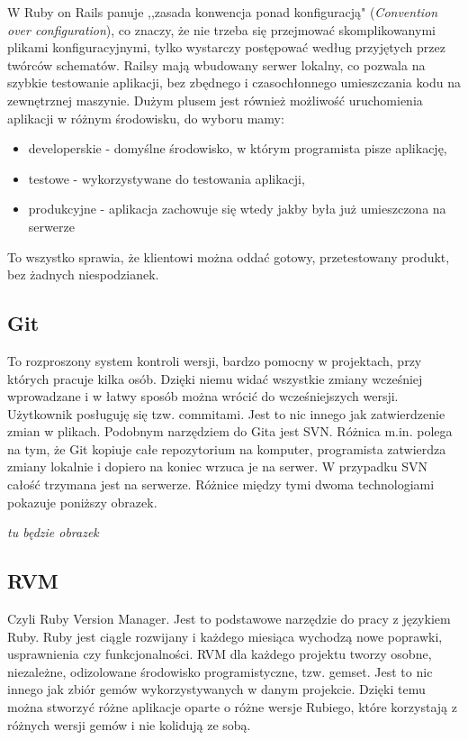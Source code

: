   W Ruby on Rails panuje ,,zasada konwencja ponad konfiguracją" (\emph{Convention over configuration}), co znaczy, że nie trzeba się przejmować skomplikowanymi plikami konfiguracyjnymi, tylko wystarczy postępować według przyjętych przez twórców schematów. Railsy mają wbudowany serwer lokalny, co pozwala na szybkie testowanie aplikacji, bez zbędnego i czasochłonnego umieszczania kodu na zewnętrznej maszynie. Dużym plusem jest również możliwość uruchomienia aplikacji w różnym środowisku, do wyboru mamy:
  \begin{itemize}
    \item developerskie - domyślne środowisko, w którym programista pisze aplikację,
    \item testowe - wykorzystywane do testowania aplikacji,
    \item produkcyjne - aplikacja zachowuje się wtedy jakby była już umieszczona na serwerze
  \end{itemize}
  To wszystko sprawia, że klientowi można oddać gotowy, przetestowany produkt, bez żadnych niespodzianek.


  \subsection{Git}
  To rozproszony system kontroli wersji, bardzo pomocny w projektach, przy których pracuje kilka osób. Dzięki niemu widać wszystkie zmiany wcześniej wprowadzane i w łatwy sposób można wrócić do wcześniejszych wersji. Użytkownik posługuję się tzw. commitami. Jest to nic innego jak zatwierdzenie zmian w plikach. Podobnym narzędziem do Gita jest SVN. Różnica m.in. polega na tym, że Git kopiuje całe repozytorium na komputer, programista zatwierdza zmiany lokalnie i dopiero na koniec wrzuca je na serwer. W przypadku SVN całość trzymana jest na serwerze. Różnice między tymi dwoma technologiami pokazuje poniższy obrazek.

  \textit{tu będzie obrazek}

  \subsection{RVM}
  Czyli Ruby Version Manager. Jest to podstawowe narzędzie do pracy z językiem Ruby. Ruby jest ciągle rozwijany i każdego miesiąca wychodzą nowe poprawki, usprawnienia czy funkcjonalności. RVM dla każdego projektu tworzy osobne, niezależne, odizolowane środowisko programistyczne, tzw. gemset. Jest to nic innego jak zbiór gemów wykorzystywanych w danym projekcie. Dzięki temu można stworzyć różne aplikacje oparte o różne wersje Rubiego, które korzystają z różnych wersji gemów i nie kolidują ze sobą.

